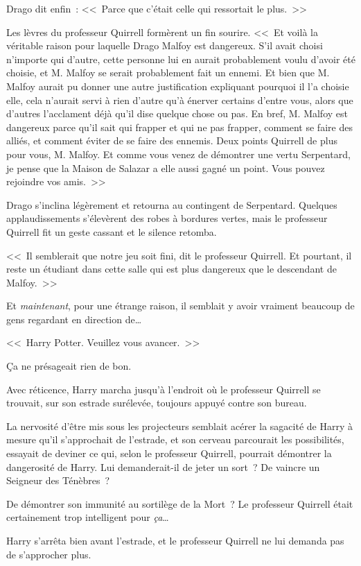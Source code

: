 Drago dit enfin~: <<~Parce que c'était celle qui ressortait le plus.~>>

Les lèvres du professeur Quirrell formèrent un fin sourire. <<~Et voilà la véritable raison pour laquelle Drago Malfoy est dangereux. S'il avait choisi n'importe qui d'autre, cette personne lui en aurait probablement voulu d'avoir été choisie, et M. Malfoy se serait probablement fait un ennemi. Et bien que M. Malfoy aurait pu donner une autre justification expliquant pourquoi il l'a choisie elle, cela n'aurait servi à rien d'autre qu'à énerver certains d'entre vous, alors que d'autres l'acclament déjà qu'il dise quelque chose ou pas. En bref, M. Malfoy est dangereux parce qu'il sait qui frapper et qui ne pas frapper, comment se faire des alliés, et comment éviter de se faire des ennemis. Deux points Quirrell de plus pour vous, M. Malfoy. Et comme vous venez de démontrer une vertu Serpentard, je pense que la Maison de Salazar a elle aussi gagné un point. Vous pouvez rejoindre vos amis.~>>

Drago s'inclina légèrement et retourna au contingent de Serpentard. Quelques applaudissements s'élevèrent des robes à bordures vertes, mais le professeur Quirrell fit un geste cassant et le silence retomba.

<<~Il semblerait que notre jeu soit fini, dit le professeur Quirrell. Et pourtant, il reste un étudiant dans cette salle qui est plus dangereux que le descendant de Malfoy.~>>

Et \emph{maintenant}, pour une étrange raison, il semblait y avoir vraiment beaucoup de gens regardant en direction de…

<<~Harry Potter. Veuillez vous avancer.~>>

Ça ne présageait rien de bon.

Avec réticence, Harry marcha jusqu'à l'endroit où le professeur Quirrell se trouvait, sur son estrade surélevée, toujours appuyé contre son bureau.

La nervosité d'être mis sous les projecteurs semblait acérer la sagacité de Harry à mesure qu'il s'approchait de l'estrade, et son cerveau parcourait les possibilités, essayait de deviner ce qui, selon le professeur Quirrell, pourrait démontrer la dangerosité de Harry. Lui demanderait-il de jeter un sort~? De vaincre un Seigneur des Ténèbres~?

De démontrer son immunité au sortilège de la Mort~? Le professeur Quirrell était certainement trop intelligent pour \emph{ça}…

Harry s'arrêta bien avant l'estrade, et le professeur Quirrell ne lui demanda pas de s'approcher plus.

